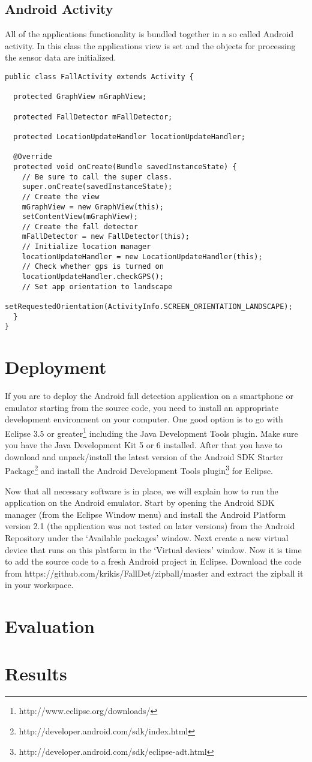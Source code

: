 \subsection{Android Activity}
All of the applications functionality is bundled together in a so called Android activity. In this class the applications view is set and the objects for processing the sensor data are initialized.
\begin{lstlisting}
public class FallActivity extends Activity {

  protected GraphView mGraphView;

  protected FallDetector mFallDetector;

  protected LocationUpdateHandler locationUpdateHandler;

  @Override
  protected void onCreate(Bundle savedInstanceState) {
    // Be sure to call the super class.
    super.onCreate(savedInstanceState);
    // Create the view
    mGraphView = new GraphView(this);
    setContentView(mGraphView);
    // Create the fall detector
    mFallDetector = new FallDetector(this);
    // Initialize location manager
    locationUpdateHandler = new LocationUpdateHandler(this);
    // Check whether gps is turned on
    locationUpdateHandler.checkGPS();
    // Set app orientation to landscape
    setRequestedOrientation(ActivityInfo.SCREEN_ORIENTATION_LANDSCAPE);
  }
}
\end{lstlisting}

\section{Deployment}
If you are to deploy the Android fall detection application on a smartphone or emulator starting from the source code, you need to install an appropriate development environment on your computer. One good option is to go with Eclipse 3.5 or greater\footnote{http://www.eclipse.org/downloads/} including the Java Development Tools plugin. Make sure you have the Java Development Kit 5 or 6 installed. After that you have to download and unpack/install the latest version of the Android SDK Starter Package\footnote{http://developer.android.com/sdk/index.html} and install the Android Development Tools plugin\footnote{http://developer.android.com/sdk/eclipse-adt.html} for Eclipse. 

Now that all necessary software is in place, we will explain how to run the application on the Android emulator. Start by opening the Android SDK manager (from the Eclipse Window menu) and install the Android Platform version 2.1 (the application was not tested on later versions) from the Android Repository under the `Available packages' window. Next create a new virtual device that runs on this platform in the `Virtual devices' window. Now it is time to add the source code to a fresh Android project in Eclipse. Download the code from https://github.com/krikis/FallDet/zipball/master and extract the zipball it in your workspace.




\section{Evaluation}
\section{Results}



